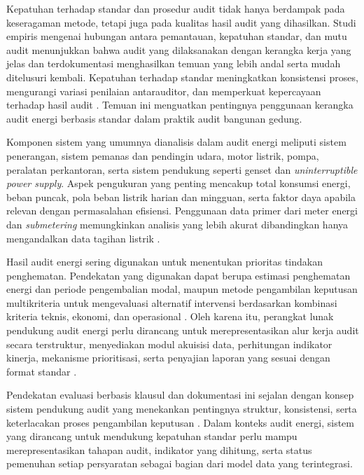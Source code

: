 Kepatuhan terhadap standar dan prosedur audit tidak hanya berdampak pada keseragaman metode, tetapi juga pada kualitas hasil audit yang dihasilkan. Studi empiris mengenai hubungan antara pemantauan, kepatuhan standar, dan mutu audit menunjukkan bahwa audit yang dilaksanakan dengan kerangka kerja yang jelas dan terdokumentasi menghasilkan temuan yang lebih andal serta mudah ditelusuri kembali. Kepatuhan terhadap standar meningkatkan konsistensi proses, mengurangi variasi penilaian antarauditor, dan memperkuat kepercayaan terhadap hasil audit \cite{owusuafriyiea2024monitoring}. Temuan ini menguatkan pentingnya penggunaan kerangka audit energi berbasis standar dalam praktik audit bangunan gedung.

Komponen sistem yang umumnya dianalisis dalam audit energi meliputi sistem penerangan, sistem pemanas dan pendingin udara, motor listrik, pompa, peralatan perkantoran, serta sistem pendukung seperti genset dan \textit{uninterruptible power supply}. Aspek pengukuran yang penting mencakup total konsumsi energi, beban puncak, pola beban listrik harian dan mingguan, serta faktor daya apabila relevan dengan permasalahan efisiensi. Penggunaan data primer dari meter energi dan \textit{submetering} memungkinkan analisis yang lebih akurat dibandingkan hanya mengandalkan data tagihan listrik \cite{hamdani2017audit}.

Hasil audit energi sering digunakan untuk menentukan prioritas tindakan penghematan. Pendekatan yang digunakan dapat berupa estimasi penghematan energi dan periode pengembalian modal, maupun metode pengambilan keputusan multikriteria untuk mengevaluasi alternatif intervensi berdasarkan kombinasi kriteria teknis, ekonomi, dan operasional \cite{putra2025evaluasi}. Oleh karena itu, perangkat lunak pendukung audit energi perlu dirancang untuk merepresentasikan alur kerja audit secara terstruktur, menyediakan modul akuisisi data, perhitungan indikator kinerja, mekanisme prioritisasi, serta penyajian laporan yang sesuai dengan format standar \cite{hermawan2022perencanaan}.

Pendekatan evaluasi berbasis klausul dan dokumentasi ini sejalan dengan konsep sistem pendukung audit yang menekankan pentingnya struktur, konsistensi, serta keterlacakan proses pengambilan keputusan \cite{dowling2007audit}. Dalam konteks audit energi, sistem yang dirancang untuk mendukung kepatuhan standar perlu mampu merepresentasikan tahapan audit, indikator yang dihitung, serta status pemenuhan setiap persyaratan sebagai bagian dari model data yang terintegrasi.

